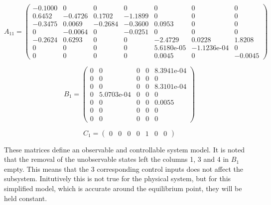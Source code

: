 \begin{equation}  \label{eq:A11}
	A_{11} = \left(\begin{array}{ccccccc}
		-0.1000 & 0 & 0 & 0 & 0 & 0 & 0\\
		0.6452 & -0.4726 & 0.1702 & -1.1899 & 0 & 0 & 0\\
		-0.3475 & 0.0069 & -0.2684 & -0.3600 & 0.0953 & 0 & 0\\
		0 & -0.0064 & 0 & -0.0251 & 0 & 0 & 0\\
		-0.2624 & 0.6293 & 0 & 0 & -2.4729 & 0.0228 & 1.8208\\
		0 & 0 & 0 & 0 & \text{5.6180e-05} & -\text{1.1236e-04} & 0\\
		0 & 0 & 0 & 0 & 0.0045 & 0 & -0.0045
	\end{array}\right)
\end{equation}

\begin{equation}  \label{eq:B1}
	B_1 = \left(\begin{array}{ccccc}
		0 & 0 & 0 & 0 & \text{8.3941e-04}\\
		0 & 0 & 0 & 0 & 0\\
		0 & 0 & 0 & 0 & \text{8.3101e-04}\\
		0 & \text{5.0703e-04} & 0 & 0 & 0\\
		0 & 0 & 0 & 0 & 0.0055\\
		0 & 0 & 0 & 0 & 0\\
		0 & 0 & 0 & 0 & 0
	\end{array}\right)
\end{equation}

\begin{equation}  \label{eq:C1}
	C_1 =\left(\begin{array}{ccccccc}
		0 & 0 & 0 & 0 & 1 & 0 & 0
	\end{array}\right)
\end{equation}

These matrices define an observable and controllable system model. It is noted that the removal of the unobservable states left the columns 1, 3 and 4 in $B_1$ empty. This means that the 3 corresponding control inputs does not affect the subsystem. Initutively this is not true for the physical system, but for this simplified model, which is accurate around the equilibrium point, they will be held constant. 